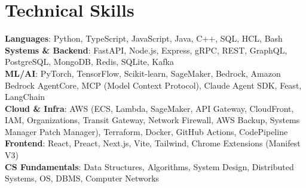 \section{\textbf{Technical Skills}}
\vspace{-2pt}
\begin{itemize}[leftmargin=0.05in, label={}]
    \small{\item{
     \textbf{Languages}{: Python, TypeScript, JavaScript, Java, C++, SQL, HCL, Bash} \\
     \textbf{Systems \& Backend}{: FastAPI, Node.js, Express, gRPC, REST, GraphQL, PostgreSQL, MongoDB, Redis, SQLite, Kafka} \\
     \textbf{ML/AI}{: PyTorch, TensorFlow, Scikit-learn, SageMaker, Bedrock, Amazon Bedrock AgentCore, MCP (Model Context Protocol), Claude Agent SDK, Feast, LangChain} \\
     \textbf{Cloud \& Infra}{: AWS (ECS, Lambda, SageMaker, API Gateway, CloudFront, IAM, Organizations, Transit Gateway, Network Firewall, AWS Backup, Systems Manager Patch Manager), Terraform, Docker, GitHub Actions, CodePipeline} \\
     \textbf{Frontend}{: React, Preact, Next.js, Vite, Tailwind, Chrome Extensions (Manifest V3)} \\
     \textbf{CS Fundamentals}{: Data Structures, Algorithms, System Design, Distributed Systems, OS, DBMS, Computer Networks}
    }}
\end{itemize}
\vspace{-2mm}
